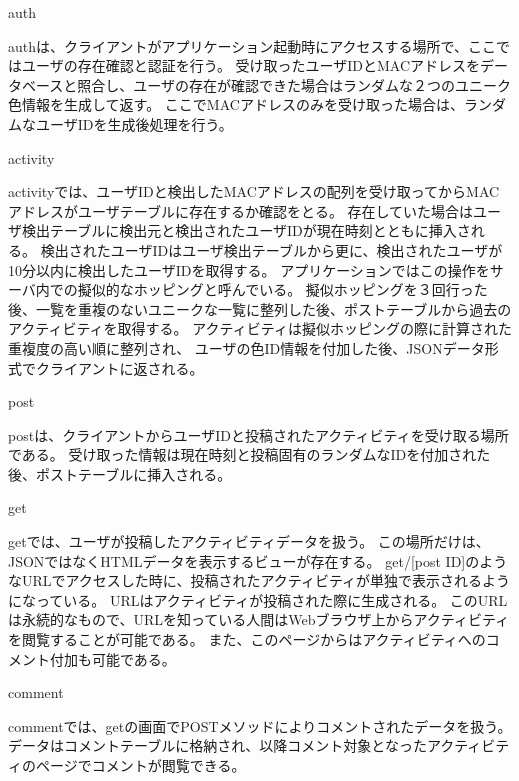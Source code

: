 \begin{description}

\item{auth}

authは、クライアントがアプリケーション起動時にアクセスする場所で、ここではユーザの存在確認と認証を行う。
受け取ったユーザIDとMACアドレスをデータベースと照合し、ユーザの存在が確認できた場合はランダムな２つのユニーク色情報を生成して返す。
ここでMACアドレスのみを受け取った場合は、ランダムなユーザIDを生成後処理を行う。

\item{activity}

activityでは、ユーザIDと検出したMACアドレスの配列を受け取ってからMACアドレスがユーザテーブルに存在するか確認をとる。
存在していた場合はユーザ検出テーブルに検出元と検出されたユーザIDが現在時刻とともに挿入される。
検出されたユーザIDはユーザ検出テーブルから更に、検出されたユーザが10分以内に検出したユーザIDを取得する。
アプリケーションではこの操作をサーバ内での擬似的なホッピングと呼んでいる。
擬似ホッピングを３回行った後、一覧を重複のないユニークな一覧に整列した後、ポストテーブルから過去のアクティビティを取得する。
アクティビティは擬似ホッピングの際に計算された重複度の高い順に整列され、
ユーザの色ID情報を付加した後、JSONデータ形式でクライアントに返される。

\item{post}

postは、クライアントからユーザIDと投稿されたアクティビティを受け取る場所である。
受け取った情報は現在時刻と投稿固有のランダムなIDを付加された後、ポストテーブルに挿入される。

\item{get}

getでは、ユーザが投稿したアクティビティデータを扱う。
この場所だけは、JSONではなくHTMLデータを表示するビューが存在する。
get/[post ID]のようなURLでアクセスした時に、投稿されたアクティビティが単独で表示されるようになっている。
URLはアクティビティが投稿された際に生成される。
このURLは永続的なもので、URLを知っている人間はWebブラウザ上からアクティビティを閲覧することが可能である。
また、このページからはアクティビティへのコメント付加も可能である。

\item{comment}

commentでは、getの画面でPOSTメソッドによりコメントされたデータを扱う。
データはコメントテーブルに格納され、以降コメント対象となったアクティビティのページでコメントが閲覧できる。

\end{description}


